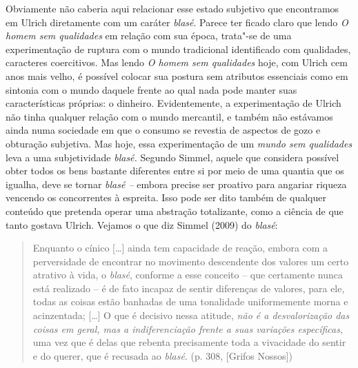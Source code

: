 {Obviamente não caberia aqui relacionar esse estado subjetivo que
encontramos em Ulrich diretamente com um caráter \emph{blasé}. Parece
ter ficado claro que lendo \emph{O homem sem qualidades} em relação com
sua época, trata"-se de uma experimentação de ruptura com o mundo
tradicional identificado com qualidades, caracteres coercitivos. Mas
lendo \emph{O homem sem qualidades} hoje, com Ulrich cem anos mais
velho, é possível colocar sua postura sem atributos essenciais como em
sintonia com o mundo daquele frente ao qual nada pode manter suas
características próprias: o dinheiro. Evidentemente, a experimentação de
Ulrich não tinha qualquer relação com o mundo mercantil, e também não
estávamos ainda numa sociedade em que o consumo se revestia de aspectos
de gozo e obturação subjetiva. Mas hoje, essa experimentação de um
\emph{mundo sem qualidades} leva a uma subjetividade \emph{blasé.}
Segundo Simmel, aquele que considera possível obter todos os bens
bastante diferentes entre si por meio de uma quantia que os igualha,
deve se tornar \emph{blasé --} embora precise ser proativo para angariar
riqueza vencendo os concorrentes à espreita. Isso pode ser dito também
de qualquer conteúdo que pretenda operar uma abstração totalizante, como
a ciência de que tanto gostava Ulrich. Vejamos o que diz Simmel (2009)
do \emph{blasé}:

\begin{quote}
Enquanto o cínico [\ldots{}] ainda tem capacidade de reação, embora
com a perversidade de encontrar no movimento descendente dos valores um
certo atrativo à vida, o \emph{blasé}, conforme a esse conceito -- que
certamente nunca está realizado -- é de fato incapaz de sentir
diferenças de valores, para ele, todas as coisas estão banhadas de uma
tonalidade uniformemente morna e acinzentada; [\ldots{}] O que é
decisivo nessa atitude, \emph{não é a desvalorização das coisas em
geral, mas a indiferenciação frente a suas variações específicas}, uma
vez que é delas que rebenta precisamente toda a vivacidade do sentir e
do querer, que é recusada ao \emph{blasé}. (p. 308, [Grifos Nossos])
\end{quote}

}
